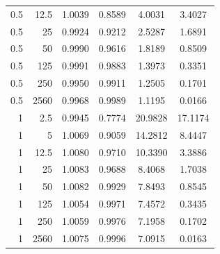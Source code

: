 \begin{tabular}{rrcccc}
0.5 & 12.5 & 1.0039 & 0.8589 & 4.0031 & 3.4027\\
0.5 & 25 & 0.9924 & 0.9212 & 2.5287 & 1.6891\\
0.5 & 50 & 0.9990 & 0.9616 & 1.8189 & 0.8509\\
0.5 & 125 & 0.9991 & 0.9883 & 1.3973 & 0.3351\\
0.5 & 250 & 0.9950 & 0.9911 & 1.2505 & 0.1701\\
0.5 & 2560 & 0.9968 & 0.9989 & 1.1195 & 0.0166\\
\midrule
1 & 2.5 & 0.9945 & 0.7774 & 20.9828 & 17.1174\\
1 & 5 & 1.0069 & 0.9059 & 14.2812 & 8.4447\\
1 & 12.5 & 1.0080 & 0.9710 & 10.3390 & 3.3886\\
1 & 25 & 1.0083 & 0.9688 & 8.4068 & 1.7038\\
1 & 50 & 1.0082 & 0.9929 & 7.8493 & 0.8545\\
1 & 125 & 1.0054 & 0.9971 & 7.4572 & 0.3435\\
1 & 250 & 1.0059 & 0.9976 & 7.1958 & 0.1702\\
1 & 2560 & 1.0075 & 0.9996 & 7.0915 & 0.0163\\
\bottomrule\end{tabular}
